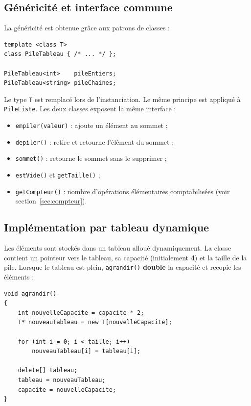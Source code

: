 \documentclass[11pt,a4paper]{article}
\begin{document}
\subsection{Généricité et interface commune}

La généricité est obtenue grâce aux patrons de classes :

\begin{lstlisting}
template <class T>
class PileTableau { /* ... */ };

PileTableau<int>    pileEntiers;
PileTableau<string> pileChaines;
\end{lstlisting}

Le type \texttt{T} est remplacé lors de l'instanciation. Le même principe est appliqué à \texttt{PileListe}. Les deux classes exposent la même interface :

\begin{itemize}[nosep]
    \item \texttt{empiler(valeur)} : ajoute un élément au sommet ;
    \item \texttt{depiler()} : retire et retourne l'élément du sommet ;
    \item \texttt{sommet()} : retourne le sommet sans le supprimer ;
    \item \texttt{estVide()} et \texttt{getTaille()} ;
    \item \texttt{getCompteur()} : nombre d'opérations élémentaires comptabilisées (voir section~\ref{sec:compteur}).
\end{itemize}

\subsection{Implémentation par tableau dynamique}

Les éléments sont stockés dans un tableau alloué dynamiquement. La classe contient un pointeur vers le tableau, sa capacité (initialement \textbf{4}) et la taille de la pile. Lorsque le tableau est plein, \texttt{agrandir()} \textbf{double} la capacité et recopie les éléments :

\begin{lstlisting}
void agrandir()
{
    int nouvelleCapacite = capacite * 2;
    T* nouveauTableau = new T[nouvelleCapacite];

    for (int i = 0; i < taille; i++)
        nouveauTableau[i] = tableau[i];

    delete[] tableau;
    tableau = nouveauTableau;
    capacite = nouvelleCapacite;
}
\end{lstlisting}
\end{document}
